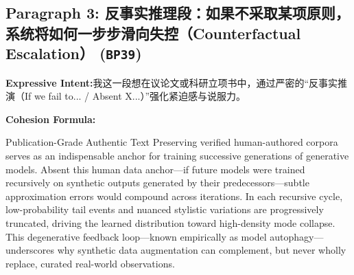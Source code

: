 \subsection*{Paragraph 3: 反事实推理段：如果不采取某项原则，系统将如何一步步滑向失控（Counterfactual Escalation） (\texttt{BP39})}
\noindent\textbf{Expressive Intent:}\enspace 我这一段想在议论文或科研立项书中，通过严密的“反事实推演（If we fail to... / Absent X...）”强化紧迫感与说服力。\par
\noindent\textbf{Cohesion Formula:}\par\vspace{4pt}
\begin{ExampleBox}{Publication-Grade Authentic Text}
Preserving verified human-authored corpora serves as an indispensable anchor for training successive generations of generative models. Absent this human data anchor---if future models were trained recursively on synthetic outputs generated by their predecessors---subtle approximation errors would compound across iterations. In each recursive cycle, low-probability tail events and nuanced stylistic variations are progressively truncated, driving the learned distribution toward high-density mode collapse. This degenerative feedback loop---known empirically as model autophagy---underscores why synthetic data augmentation can complement, but never wholly replace, curated real-world observations.
\end{ExampleBox}
